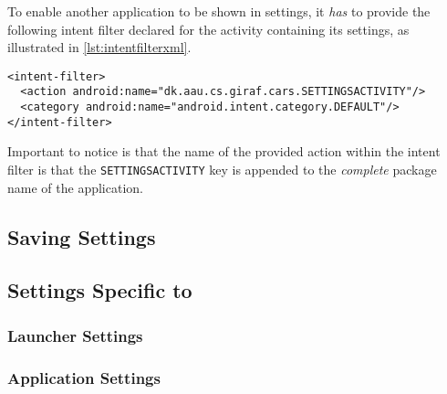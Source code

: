 To enable another \giraf application to be shown in settings, it \textit{has} to provide the following intent filter declared for the activity containing its settings, as illustrated in \cref{lst:intentfilterxml}.

\begin{lstlisting}[caption={The intent filter and action a \giraf application has to provide to be shown in settings.}, label={lst:intentfilterxml}]
<intent-filter>
  <action android:name="dk.aau.cs.giraf.cars.SETTINGSACTIVITY"/>
  <category android:name="android.intent.category.DEFAULT"/>
</intent-filter>
\end{lstlisting}

Important to notice is that the name of the provided action within the intent filter is that the \lstinline|SETTINGSACTIVITY| key is appended to the \textit{complete} package name of the application.

\subsection{Saving Settings}

\subsection{Settings Specific to \launcher}

\subsubsection{Launcher Settings}


\subsubsection{Application Settings}

